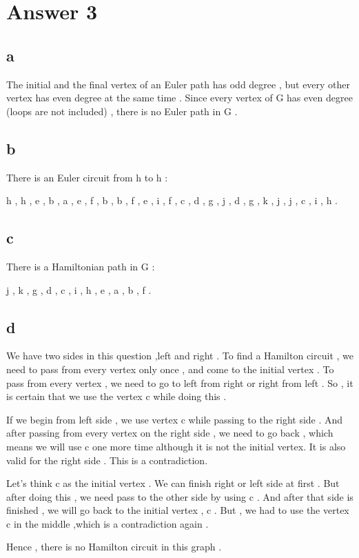 \documentclass[11pt]{article}
\begin{document}
\section*{Answer 3}
\subsection*{a}
\hspace{15px} The initial and the final vertex of an Euler path has odd degree , but every other vertex has even degree at the same time . Since every vertex of G has even degree (loops are not included) , there is no Euler path in G . 
\subsection*{b}
\hspace{12px} There is an Euler circuit from h to h : \par 
h , h , e , b , a , e , f , b , b , f , e , i , f , c , d , g , j , d , g , k , j , j , c , i , h . 
\subsection*{c}
\hspace{12px} There is a Hamiltonian path in G : \par 
j , k , g , d , c , i , h , e , a , b , f .  
\subsection*{d}
\hspace{15px} We have two sides in this question ,left and right . To find a Hamilton circuit , we need to pass from every vertex only once , and come to the initial vertex . To pass from every vertex , we need to go to left from right or right from left . So , it is certain that we use the vertex c while doing this . \par 
If we begin from left side , we use vertex c while passing to the right side . And after passing from every vertex on the right side , we need to go back , which means we will use c one more time although it is not the initial vertex. It is also valid for the right side . This is a contradiction. \par 
Let's think c as the initial vertex . We can finish right or left side at first . But after doing this , we need pass to the other side by using c . And after that side is finished , we will go back to the initial vertex , c . But , we had to use the vertex c in the middle ,which is a contradiction again . \par 
Hence , there is no Hamilton circuit in this graph .
\end{document}
